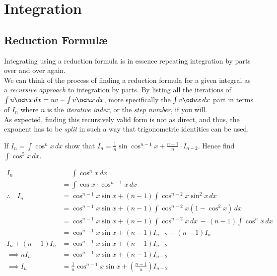 
	\chapter{Integration}
	\section{Reduction Formul\ae}
	Integrating using a reduction formula is in essence repeating integration by parts over and over again.\\
	
	
	 We can think of the process of finding a reduction formula for a given integral as a \emph{recursive approach} to integration by parts. By listing all the iterations of $\textstyle\int u\od vx\,dx= uv-\int v\od ux\,dx$, more specifically the $\textstyle\int v\od ux\,dx$ part in terms of $I_n$ where $n$ is the \emph{iterative index}, or the \textit{step number}, if you will.\\
	
	As expected, finding this recursively valid form is not as direct, and thus, the exponent has to be \textit{split} in such a way that trigonometric identities can be used.
	\begin{example}
		If $I_n = \int \cos^n x \, dx$ show that $I_n = \frac{1}{n} \sin\cos^{n-1}x + \frac{n-1}{n}\cdot I_{n-2}$. Hence find $\int \cos^5x\, dx$.
	\end{example}
	
	\begin{align*}
		I_n                  & = \int \cos^n x \, dx                                                       \\
		& = \int \cos x \cdot \cos^{n-1}x\, dx                                        \\
		\therefore \quad I_n & = \cos^{n-1}x\sin x + (n-1)\int\cos^{n-2}x\sin^2x\,dx                       \\
		& = \cos^{n-1}x\sin x + (n-1)\int\cos^{n-2}x(1-\cos^2x)\,dx                   \\
		& = \cos^{n-1}x\sin x + (n-1)\int\cos^{n-2}x \, dx \,-\, (n-1)\int\cos^nx\,dx \\
		& = \cos^{n-1}x\sin x + (n-1)I_{n-2} - (n-1)I_n                               \\
		I_n + (n-1)I_n       & = \cos^{n-1}x\sin x + (n-1)I_{n-2}                                          \\
		\implies  nI_n       & = \cos^{n-1}x\sin x + (n-1)I_{n-2}                                          \\
		\implies I_n         & = \frac1n\cos^{n-1}x\sin x + \left(\frac{n-1}n\right)I_{n-2}                \\
	\end{align*}
	
